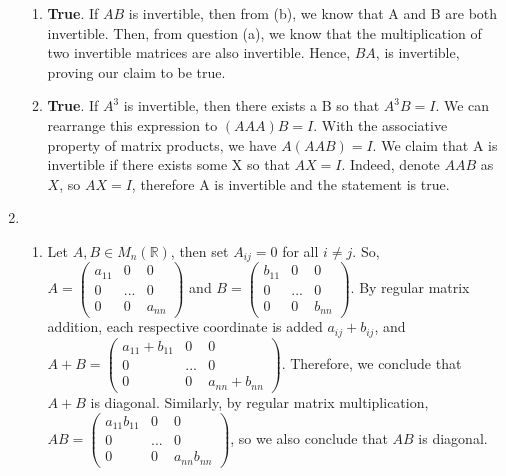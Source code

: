 \documentclass{article}
\begin{document}
\begin{enumerate}
\begin{enumerate}
\item \textbf{True}. If $AB$ is invertible, then from (b), we know that A and B are both invertible. Then, from question (a), we know that the multiplication of two invertible matrices are also invertible. Hence, $BA$, is invertible, proving our claim to be true.

\item \textbf{True}. If $A^3$ is invertible, then there exists a B so that $A^3B = I$. We can rearrange this expression to $(AAA)B = I$. With the associative property of matrix products, we have $A(AAB) = I$. We claim that A is invertible if there exists some X so that $AX = I$. Indeed, denote $AAB$ as $X$, so $AX = I$, therefore A is invertible and the statement is true.

\end{enumerate}

\item

\begin{enumerate}

\item Let $A,B \in M_n(\mathbb{R})$, then set $A_{ij} = 0$ for all $i \neq j$. So, $A = \left(\begin{array}{ccc} a_{11} & 0 & 0 \\ 0 & ... & 0 \\ 0 & 0 & a_{nn} \end{array}\right)$ 
and $B = \left(\begin{array}{ccc} b_{11} & 0 & 0 \\ 0 & ... & 0 \\ 0 & 0 & b_{nn} \end{array}\right)$. By regular matrix addition, each respective coordinate is added $a_{ij} + b_{ij}$, and
$A + B = \left(\begin{array}{ccc} a_{11} + b_{11} & 0 & 0 \\ 0 & ... & 0 \\ 0 & 0 & a_{nn} + b_{nn} \end{array}\right)$. Therefore, we conclude that $A + B$ is diagonal.
Similarly, by regular matrix multiplication, $AB = \left(\begin{array}{ccc} a_{11} b_{11} & 0 & 0 \\ 0 & ... & 0 \\ 0 & 0 & a_{nn}b_{nn} \end{array}\right)$, so we also conclude that $AB$ is diagonal.


\end{enumerate}
\end{enumerate}
\end{document}
